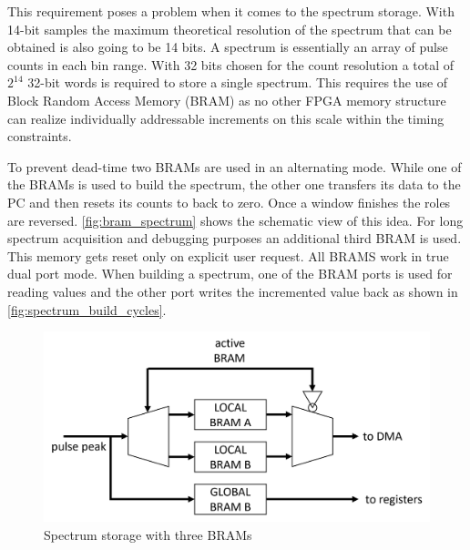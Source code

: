 This requirement poses a problem when it comes to the spectrum storage.
With 14-bit samples the maximum theoretical resolution of the spectrum
that can be obtained is also going to be 14 bits. A spectrum is essentially 
an array of pulse counts in each bin range. With 32 bits chosen 
for the count resolution a total of $2^{14}$ 32-bit words is required to 
store a single spectrum.
This requires the use of Block Random Access Memory (BRAM)
as no other FPGA memory structure can realize
individually addressable increments on this scale within the timing constraints.


To prevent dead-time two BRAMs are used in an alternating mode.
While one of the BRAMs is used to build the spectrum, the other one
transfers its data to the PC and then resets its counts to back to zero.
Once a window finishes the roles are reversed.
\autoref{fig:bram_spectrum} shows the schematic view of this idea. 
For long spectrum acquisition and debugging purposes an additional third BRAM is used. 
This memory gets reset only on explicit user request.
All BRAMS work in true dual port mode.
When building a spectrum, one of the BRAM ports is used for reading
values and the other port writes the incremented value back as
shown in \autoref{fig:spectrum_build_cycles}.

\begin{figure}[H]
  \centering
  \includegraphics[width=\linewidth]{media/bram_spectrum.png}
  \caption{Spectrum storage with three BRAMs}
  \label{fig:bram_spectrum} 
\end{figure}

